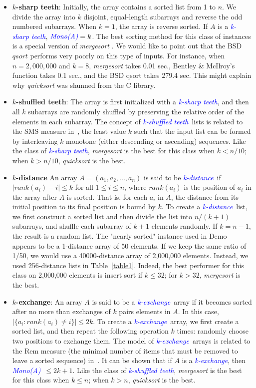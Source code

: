 \documentclass[AMA,STIX1COL]{WileyNJD-v2}
\newcommand{\ksha}{\textcolor{blue}{\emph{k-sharp teeth}}}
\newcommand{\kshu}{\textcolor{blue}{\emph{k-shuffled teeth}}}
\newcommand{\kdis}{\textcolor{blue}{\emph{k-distance}}}
\newcommand{\kexc}{\textcolor{blue}{\emph{k-exchange}}}
\newcommand {\mono}{\emph{\textcolor{blue}{Mono(A)}}}
\newcommand{\qusort}{\emph{quicksort }}
\newcommand{\msort}{\emph{mergesort }}
\begin{document}
\begin{itemize}
\item \textbf{$k$-sharp teeth}:
Initially, the array contains a sorted list from 1 to $n$. 
We divide the array into $k$ disjoint, equal-length subarrays and reverse the odd numbered subarrays.  
When $k =1$, the array is reverse sorted. 
If $A$ is a \ksha, $\mono = k$.  
The best sorting method for this class of instances is a special version of \msort. 
We would like to point out that the BSD $qsort$ performs very poorly on this type of inputs. 
For instance, when $n = 2,000,000$ and $k = 8$, \msort takes 0.01 sec., Bentley \& McIlroy's function takes 0.1 sec., and the BSD qsort takes 279.4 sec. 
This might explain why \qusort was shunned from the C library.

\item \textbf{$k$-shuffled teeth}: 
The array is first initialized with a \ksha, and then all $k$ subarrays are randomly shuffled by preserving the relative order of the elements in each subarray.
The concept of \kshu \ lists is related to the SMS measure in~\cite{moffat1996splaysort}, the least value $k$ such that the input list can be formed by interleaving $k$ monotone (either descending or ascending) sequences.  
Like the class of \ksha, \msort is the best for this class when $k < n/10$; when $k > n/10$, \qusort is the best. 

\item \textbf{$k$-distance}
An array $A = (a_1, a_2, ..., a_n)$ is said to be \kdis \ if $|rank(a_i) -  i| \leq k$ for all $1\leq i \leq n$, where $rank(a_i)$ is the position of $a_i$ in the array after $A$ is sorted. 
That is, for each $a_i$ in $A$, the distance from its initial position to its final position is bound by $k$. 
To create a \kdis \ list, we first construct a sorted list and then divide the list into $n/(k+1)$ subarrays, and shuffle each subarray of $k+1$ elements randomly.  
If $k = n -1$, the result is a random list. 
The "nearly sorted" instance used in Demo appears to be a 1-distance array of 50 elements.  
If we keep the same ratio of 1/50, we would use a 40000-distance array of 2,000,000 elements. 
Instead, we used 256-distance lists in Table~\ref{table1}. 
Indeed, the best performer for this class on 2,000,000 elements is insert sort if $k \leq 32$; for $k > 32$, \msort is the best.

\item \textbf{$k$-exchange}: An array $A$ is said to be a \kexc \ array if it becomes sorted after no more than exchanges of $k$ pairs elements in $A$. 
In this case,  $|\{a_i : rank(a_i) \neq i\}| \leq 2k$.  
To create a \kexc \ array, we first create a sorted list, and then repeat the following operation $k$ times: randomly choose two positions to exchange them. 
The model of \kexc \ arrays is related to the Rem measure (the minimal number of items that must be removed to leave a sorted sequence) in~\cite{moffat1996splaysort}. 
It can be shown that if $A$ is a \kexc, then \mono\ $\leq 2k+1$. 
Like the class of \kshu, \msort is the best for this class when $k \leq n$; when $k > n$, \qusort is the best.                                                
\end{itemize}              
\end{document}
